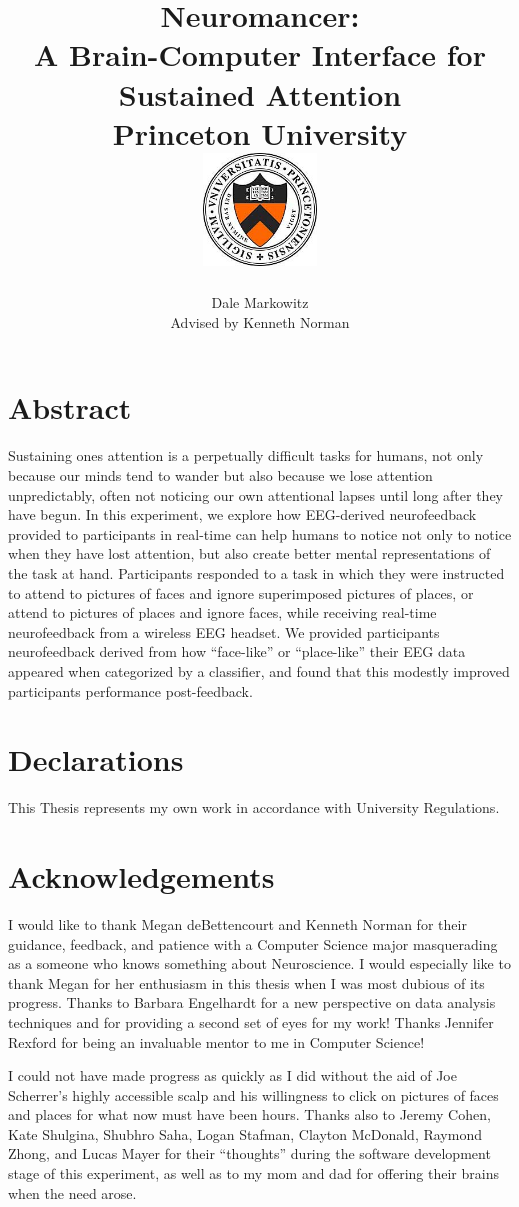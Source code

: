 \documentclass[12pt]{report}
\title{
{Neuromancer:\\ A Brain-Computer Interface for Sustained Attention}\\
{\large Princeton University}\\
{\bigskip{} \includegraphics[width=3cm]{crest.jpg}}
}
\author{Dale Markowitz\\
 Advised by Kenneth Norman}
\begin{document}
\maketitle{}

\newpage{}
\chapter*{Abstract}
	Sustaining one\textquotesingle s attention is a perpetually difficult tasks for humans, not only because our minds tend to wander but also because we lose attention unpredictably, often not noticing our own attentional lapses until long after they have begun.  In this experiment, we explore how EEG-derived neurofeedback provided to participants in real-time can help humans to notice not only to notice when they have lost attention, but also create better mental representations of the task at hand.  Participants responded to a task in which they were instructed to attend to pictures of faces and ignore superimposed pictures of places, or attend to pictures of places and ignore faces, while receiving real-time neurofeedback from a wireless EEG headset.  We provided participants neurofeedback derived from how “face-like” or “place-like” their EEG data appeared when categorized by a classifier, and found that this modestly improved participants performance post-feedback.

\chapter*{Declarations}
This Thesis represents my own work in accordance with University Regulations.

\chapter*{Acknowledgements}

	I would like to thank Megan deBettencourt and Kenneth Norman for their guidance, feedback, and patience with a Computer Science major masquerading as a someone who knows something about Neuroscience.  I would especially like to thank Megan for her enthusiasm in this thesis when I was most dubious of its progress.  Thanks to Barbara Engelhardt for a new perspective on data analysis techniques and for providing a second set of eyes for my work!  Thanks Jennifer Rexford for being an invaluable mentor to me in Computer Science!

	I could not have made progress as quickly as I did without the aid of Joe Scherrer's highly accessible scalp and his willingness to click on pictures of faces and places for what now must have been hours.  Thanks also to Jeremy Cohen, Kate Shulgina, Shubhro Saha, Logan Stafman, Clayton McDonald, Raymond Zhong, and Lucas Mayer for their ``thoughts'' during the software development stage of this experiment, as well as to my mom and dad for offering their brains when the need arose.  
	
\end{document}
